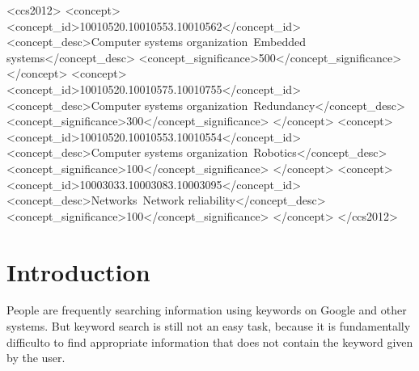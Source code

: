 \documentclass[manuscript,screen,review]{acmart}
\begin{document}
\begin{CCSXML}
<ccs2012>
 <concept>
  <concept_id>10010520.10010553.10010562</concept_id>
  <concept_desc>Computer systems organization~Embedded systems</concept_desc>
  <concept_significance>500</concept_significance>
 </concept>
 <concept>
  <concept_id>10010520.10010575.10010755</concept_id>
  <concept_desc>Computer systems organization~Redundancy</concept_desc>
  <concept_significance>300</concept_significance>
 </concept>
 <concept>
  <concept_id>10010520.10010553.10010554</concept_id>
  <concept_desc>Computer systems organization~Robotics</concept_desc>
  <concept_significance>100</concept_significance>
 </concept>
 <concept>
  <concept_id>10003033.10003083.10003095</concept_id>
  <concept_desc>Networks~Network reliability</concept_desc>
  <concept_significance>100</concept_significance>
 </concept>
</ccs2012>
\end{CCSXML}




\maketitle

\section{Introduction}

People are frequently searching information using keywords on Google
and other systems.
But keyword search is still not an easy task,
because it is fundamentally difficulto to find appropriate information
that does not contain the keyword given by the user.

\end{document}
